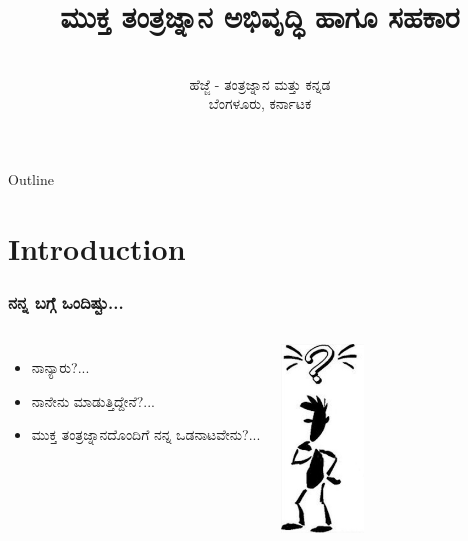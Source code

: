 \documentclass[slidestop,compress,brown]{beamer}
\title[\tiny{\en{FLOSS Development and Contribution}}]{ಮುಕ್ತ ತಂತ್ರಜ್ನಾನ ಅಭಿವೃದ್ಧಿ ಹಾಗೂ ಸಹಕಾರ}
\author[ವಾಸು]{\en{Vasudev Kamath}}
\institute[\en{Debian}]{}
\date[ಹೆಜ್ಜೆ, ಬೆಂಗಳೂರು, ಕರ್ನಾಟಕ]{\en{January 22, 2012}\\
  ಹೆಜ್ಜೆ - ತಂತ್ರಜ್ನಾನ ಮತ್ತು ಕನ್ನಡ\\
  ಬೆಂಗಳೂರು, ಕರ್ನಾಟಕ}
\newcommand\en[1]{{\english #1}}
\begin{document}
\begin{frame}
  \titlepage
\end{frame}  

\begin{frame}{\en{Outline}}
  \tableofcontents
\end{frame}

\section{\en{Introduction}}
\begin{frame}
  \frametitle{ನನ್ನ ಬಗ್ಗೆ ಒಂದಿಷ್ಟು...}
  \begin{columns}[c]
    \begin{itemize}[<+->]    
    \item<+-| alert@+> ನಾನ್ಯಾರು?...\\
    \item<+-| alert@+> ನಾನೇನು ಮಾಡುತ್ತಿದ್ದೇನೆ?...\\
    \item<+-| alert@+> ಮುಕ್ತ ತಂತ್ರಜ್ನಾನದೊಂದಿಗೆ ನನ್ನ ಒಡನಾಟವೇನು?...\\
    \end{itemize}
    \includegraphics[height=5cm,keepaspectratio]{who-am-i}
  \end{columns}
\end{frame}

\end{document}
